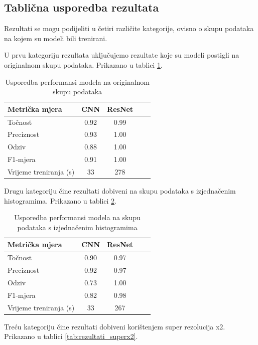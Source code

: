 \documentclass[a4paper,twocolumn]{article}
\begin{document}
\subsection{Tablična usporedba rezultata}

Rezultati se mogu podijeliti u četiri različite kategorije, ovisno o skupu podataka na kojem su modeli bili trenirani. 

U prvu kategoriju rezultata uključujemo rezultate koje su modeli postigli na originalnom skupu podataka. Prikazano u tablici \ref{tab:rezultati_originalno}.

\begin{table}[h!]
\centering
\begin{tabular}{@{}lcccc@{}}
\toprule
Metrička mjera & CNN & ResNet \\
\midrule
Točnost & 0.92 & 0.99 \\
Preciznost & 0.93 & 1.00 \\
Odziv & 0.88 & 1.00 \\
F1-mjera & 0.91 & 1.00 \\
Vrijeme treniranja (s) & 33 & 278  \\
\bottomrule
\end{tabular}
\caption{Usporedba performansi modela na originalnom skupu podataka}
\label{tab:rezultati_originalno}
\end{table}

Drugu kategoriju čine rezultati dobiveni na skupu podataka s izjednačenim histogramima. Prikazano u tablici \ref{tab:rezultati_histogram}.

\begin{table}[h!]
\centering
\begin{tabular}{@{}lcccc@{}}
\toprule
Metrička mjera & CNN & ResNet \\
\midrule
Točnost & 0.90 & 0.97 \\
Preciznost & 0.92 & 0.97 \\
Odziv & 0.73 & 1.00 \\
F1-mjera & 0.82 & 0.98 \\
Vrijeme treniranja (s) & 33 & 267  \\
\bottomrule
\end{tabular}
\caption{Usporedba performansi modela na skupu podataka s izjednačenim histogramima}
\label{tab:rezultati_histogram}
\end{table}

Treću kategoriju čine rezultati dobiveni korištenjem super rezolucija x2. Prikazano u tablici \ref{tab:rezultati_superx2}.
\end{document}
